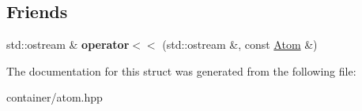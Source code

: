 \subsection*{Friends}
\begin{DoxyCompactItemize}
\item 
\mbox{\label{structAtom_a0b4533cd3ad55d6afaba9d291ded714b}} 
std\+::ostream \& {\bfseries operator$<$$<$} (std\+::ostream \&, const \mbox{\hyperlink{structAtom}{Atom}} \&)
\end{DoxyCompactItemize}


The documentation for this struct was generated from the following file\+:\begin{DoxyCompactItemize}
\item 
container/atom.\+hpp\end{DoxyCompactItemize}
